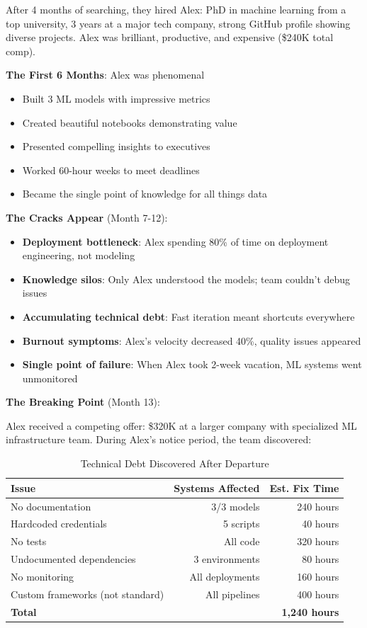 After 4 months of searching, they hired Alex: PhD in machine learning from a top university, 3 years at a major tech company, strong GitHub profile showing diverse projects. Alex was brilliant, productive, and expensive (\$240K total comp).

\textbf{The First 6 Months}: Alex was phenomenal
\begin{itemize}
    \item Built 3 ML models with impressive metrics
    \item Created beautiful notebooks demonstrating value
    \item Presented compelling insights to executives
    \item Worked 60-hour weeks to meet deadlines
    \item Became the single point of knowledge for all things data
\end{itemize}

\textbf{The Cracks Appear} (Month 7-12):
\begin{itemize}
    \item \textbf{Deployment bottleneck}: Alex spending 80\% of time on deployment engineering, not modeling
    \item \textbf{Knowledge silos}: Only Alex understood the models; team couldn't debug issues
    \item \textbf{Accumulating technical debt}: Fast iteration meant shortcuts everywhere
    \item \textbf{Burnout symptoms}: Alex's velocity decreased 40\%, quality issues appeared
    \item \textbf{Single point of failure}: When Alex took 2-week vacation, ML systems went unmonitored
\end{itemize}

\textbf{The Breaking Point} (Month 13):

Alex received a competing offer: \$320K at a larger company with specialized ML infrastructure team. During Alex's notice period, the team discovered:

\begin{table}[h]
\centering
\caption{Technical Debt Discovered After Departure}
\begin{tabular}{lrr}
\toprule
\textbf{Issue} & \textbf{Systems Affected} & \textbf{Est. Fix Time} \\
\midrule
No documentation & 3/3 models & 240 hours \\
Hardcoded credentials & 5 scripts & 40 hours \\
No tests & All code & 320 hours \\
Undocumented dependencies & 3 environments & 80 hours \\
No monitoring & All deployments & 160 hours \\
Custom frameworks (not standard) & All pipelines & 400 hours \\
\midrule
\textbf{Total} & & \textbf{1,240 hours} \\
\bottomrule
\end{tabular}
\end{table}

